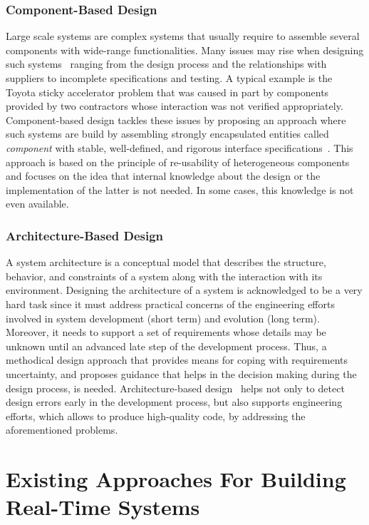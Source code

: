 \subsubsection{Component-Based Design}

Large scale systems are complex systems that usually require to assemble several
components with wide-range functionalities. Many issues may rise when designing such 
systems~\cite{intro:cb} ranging from the design process and the relationships with suppliers to 
incomplete specifications and testing. A typical example is the Toyota sticky accelerator 
problem that was caused in part by components provided by two contractors whose interaction 
was not verified appropriately.
Component-based design tackles these issues by proposing an approach where such systems
are build by assembling strongly encapsulated entities called \emph{component} with 
stable, well-defined, and rigorous interface specifications~\cite{intro:cb2}.
This approach is based on the principle of re-usability of heterogeneous components and focuses
on the idea that internal knowledge about the design or the implementation of the latter is
not needed. In some cases, this knowledge is not even available. 

\subsubsection{Architecture-Based Design}

A system architecture is a conceptual model that describes the structure, behavior, and 
constraints 
of a system along with the interaction with its environment. Designing the architecture of 
a system is acknowledged to be a very hard task since it must address practical concerns
of the engineering efforts~\cite{intro:ab2} involved in system development (short term) 
and evolution (long term). Moreover, it needs to support a set of requirements whose
details may be unknown until an advanced late step of the development process. 
Thus, a methodical design approach that provides means for coping with requirements uncertainty,
and proposes guidance that helps in the decision making during the design process, is needed.
Architecture-based design~\cite{intro:ab} helps not only to detect design errors early in the 
development process, but also supports engineering efforts, which allows to produce 
high-quality code, by addressing the aforementioned problems.

\section{Existing Approaches For Building Real-Time Systems}


